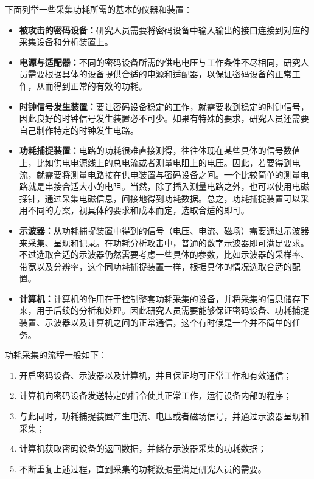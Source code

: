 下面列举一些采集功耗所需的基本的仪器和装置： \cite{paa_cn}

\begin{itemize}
\item \textbf{被攻击的密码设备：}研究人员需要将密码设备中输入输出的接口连接到对应的采集设备和分析装置上。
\item \textbf{电源与适配器：}不同的密码设备所需的供电电压与工作条件不尽相同，研究人员需要根据具体的设备提供合适的电源和适配器，以保证密码设备的正常工作，从而得到正常的有效的功耗。
\item \textbf{时钟信号发生装置：}要让密码设备稳定的工作，就需要收到稳定的时钟信号，因此良好的时钟信号发生装置必不可少。如果有特殊的要求，研究人员还需要自己制作特定的时钟发生电路。
\item \textbf{功耗捕捉装置：}电路的功耗很难直接测得，往往体现在某些具体的信号数值上，比如供电电源线上的总电流或者测量电阻上的电压。因此，若要得到电流，就需要将测量电路接在供电装置与密码设备之间。一个比较简单的测量电路就是串接合适大小的电阻。当然，除了插入测量电路之外，也可以使用电磁探针，通过采集电磁信息，间接地得到功耗数据。总之，功耗捕捉装置可以采用不同的方案，视具体的要求和成本而定，选取合适的即可。
\item \textbf{示波器：}从功耗捕捉装置中得到的信号（电压、电流、磁场）需要通过示波器来采集、呈现和记录。在功耗分析攻击中，普通的数字示波器即可满足要求。不过选取合适的示波器仍然需要考虑一些具体的参数，比如示波器的采样率、带宽以及分辨率，这个同功耗捕捉装置一样，根据具体的情况选取合适的配置。
\item \textbf{计算机：}计算机的作用在于控制整套功耗采集的设备，并将采集的信息储存下来，用于后续的分析和处理。因此研究人员需要能够保证密码设备、功耗捕捉装置、示波器以及计算机之间的正常通信，这个有时候是一个并不简单的任务。

\end{itemize}

\vspace*{\baselineskip}

功耗采集的流程一般如下：

\begin{enumerate}
\item 开启密码设备、示波器以及计算机，并且保证均可正常工作和有效通信；
\item 计算机向密码设备发送特定的指令使其正常工作，运行设备内部的程序；
\item 与此同时，功耗捕捉装置产生电流、电压或者磁场信号，并通过示波器呈现和采集；
\item 计算机获取密码设备的返回数据，并储存示波器采集的功耗数据；
\item 不断重复上述过程，直到采集的功耗数据量满足研究人员的需要。

\end{enumerate}


